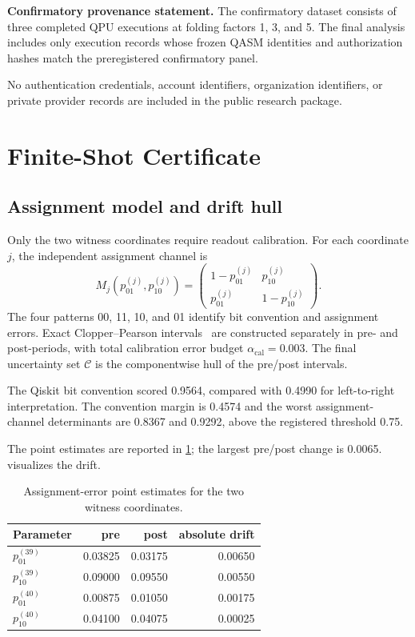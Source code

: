 \documentclass[11pt]{article}
\begin{document}
\medskip
\noindent\textbf{Confirmatory provenance statement.}
The confirmatory dataset consists of three completed QPU executions at folding factors 1, 3, and 5. The final analysis includes only execution records whose frozen QASM identities and authorization hashes match the preregistered confirmatory panel.

No authentication credentials, account identifiers, organization identifiers, or private provider records are included in the public research package.

\section{Finite-Shot Certificate}
\subsection{Assignment model and drift hull}
Only the two witness coordinates require readout calibration. For each coordinate $j$, the independent assignment channel is
\begin{equation}
M_j\!\left(p^{(j)}_{01},p^{(j)}_{10}\right)=
\begin{pmatrix}
1-p^{(j)}_{01} & p^{(j)}_{10}\\
p^{(j)}_{01} & 1-p^{(j)}_{10}
\end{pmatrix}.
\end{equation}
The four patterns 00, 11, 10, and 01 identify bit convention and assignment errors. Exact Clopper--Pearson intervals~\cite{clopper1934intervals} are constructed separately in pre- and post-periods, with total calibration error budget $\alpha_{\mathrm{cal}}=0.003$. The final uncertainty set $\mathcal{C}$ is the componentwise hull of the pre/post intervals.

The Qiskit bit convention scored 0.9564, compared with 0.4990 for left-to-right interpretation. The convention margin is 0.4574 and the worst assignment-channel determinants are 0.8367 and 0.9292, above the registered threshold 0.75.

The point estimates are reported in \cref{tab:calibration}; the largest pre/post change is 0.0065.  visualizes the drift.

\begin{table}[t]
\centering
\caption{Assignment-error point estimates for the two witness coordinates.}
\label{tab:calibration}
\begin{tabular}{@{}lrrr@{}}
\toprule
Parameter & pre & post & absolute drift \\
\midrule
$p^{(39)}_{01}$ & 0.03825 & 0.03175 & 0.00650 \\
$p^{(39)}_{10}$ & 0.09000 & 0.09550 & 0.00550 \\
$p^{(40)}_{01}$ & 0.00875 & 0.01050 & 0.00175 \\
$p^{(40)}_{10}$ & 0.04100 & 0.04075 & 0.00025 \\
\bottomrule
\end{tabular}
\end{table}
\end{document}
